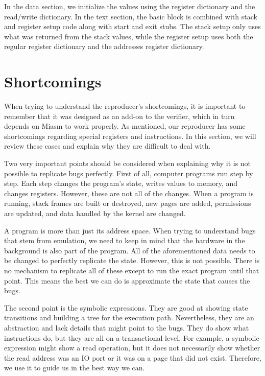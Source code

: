 In the data section, we initialize the values using the register dictionary and the read/write dictionary.
In the text section, the basic block is combined with stack and register setup code along with start and exit stubs.
The stack setup only uses what was returned from the stack values, while the register setup uses both the regular register dictionary and the addresses register dictionary.

\section{Shortcomings}
When trying to understand the reproducer's shortcomings, it is important to remember that it was designed as an add-on to the verifier, which in turn depends on Miasm to work properly.
As mentioned, our reproducer has some shortcomings regarding special registers and instructions.
In this section, we will review these cases and explain why they are difficult to deal with.

Two very important points should be considered when explaining why it is not possible to replicate bugs perfectly.
First of all, computer programs run step by step.
Each step changes the program's state, writes values to memory, and changes registers.
However, these are not all of the changes.
When a program is running, stack frames are built or destroyed, new pages are added, permissions are updated, and data handled by the kernel are changed.

A program is more than just its address space.
When trying to understand bugs that stem from emulation, we need to keep in mind that the hardware in the background is also part of the program.
All of the aforementioned data needs to be changed to perfectly replicate the state.
However, this is not possible.
There is no mechanism to replicate all of these except to run the exact program until that point.
This means the best we can do is approximate the state that causes the bugs.

The second point is the symbolic expressions.
They are good at showing state transitions and building a tree for the execution path.
Nevertheless, they are an abstraction and lack details that might point to the bugs.
They do show what instructions do, but they are all on a transactional level.
For example, a symbolic expression might show a read operation, but it does not necessarily show whether the read address was an IO port or it was on a page that did not exist.
Therefore, we use it to guide us in the best way we can.

